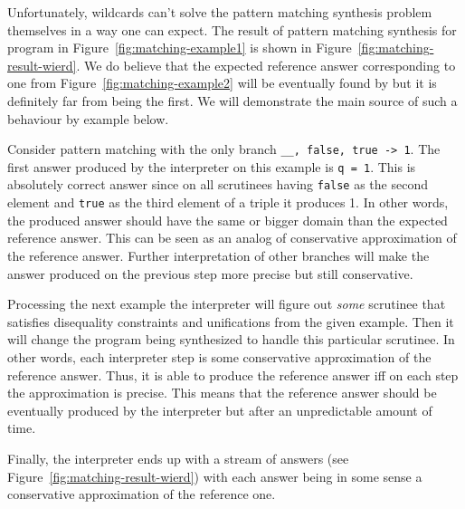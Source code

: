 

Unfortunately, wildcards can't solve the pattern matching synthesis problem themselves in a way one can expect.
The result of pattern matching synthesis for program in Figure~\ref{fig:matching-example1} is shown in Figure~\ref{fig:matching-result-wierd}. We do believe that the expected reference answer corresponding to one from Figure~\ref{fig:matching-example2} will be eventually found by \OCanren{} but it is definitely far from being the first.
We will demonstrate the main source of such a behaviour by example below.

Consider pattern matching with the only branch \lstinline{__, false, true -> 1}.
The first answer produced by the interpreter on this example is \lstinline{q = 1}.
This is absolutely correct answer since on all scrutinees having \lstinline{false} as the second element and \lstinline{true} as the third element of a triple it produces 1.
In other words, the produced answer should have the same or bigger domain than the expected reference answer.
This can be seen as an analog of conservative approximation of the reference answer.
Further interpretation of other branches will make the answer produced on the previous step more precise but still conservative.

Processing the next example the interpreter will figure out \emph{some} scrutinee that satisfies disequality constraints and unifications from the given example.
Then it will change the program being synthesized to handle this particular scrutinee.
In other words, each interpreter step is some conservative approximation of the reference answer.
Thus, it is able to produce the reference answer iff on each step the approximation is precise.
This means that the reference answer should be eventually produced by the interpreter but after an unpredictable amount of time.

Finally, the interpreter ends up with a stream of answers (see Figure~\ref{fig:matching-result-wierd}) with each answer being in some sense a conservative approximation of the reference one.

